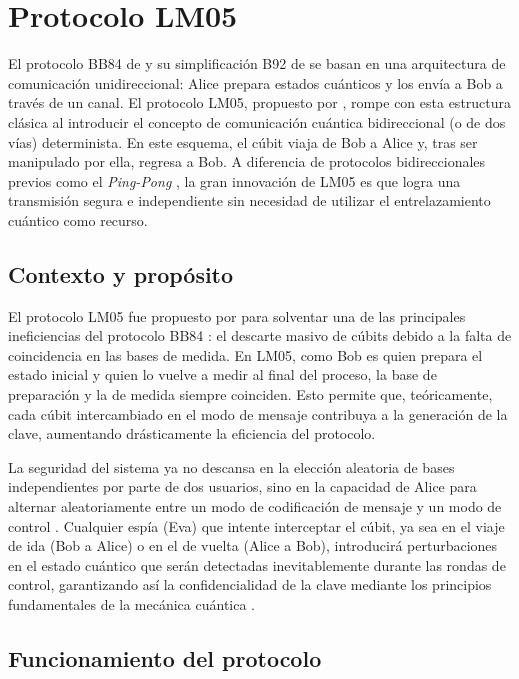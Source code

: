 \section{Protocolo LM05}

El protocolo BB84 de \cite{bennett1984} y su simplificación B92 de \cite{bennett1992} se basan en una arquitectura de comunicación unidireccional: Alice prepara estados cuánticos y los envía a Bob a través de un canal. El protocolo LM05, propuesto por \cite{lucamarini2005}, rompe con esta estructura clásica al introducir el concepto de comunicación cuántica bidireccional (o de dos vías) determinista. En este esquema, el cúbit viaja de Bob a Alice y, tras ser manipulado por ella, regresa a Bob. A diferencia de protocolos bidireccionales previos como el \textit{Ping-Pong} \citep{bostrom2002}, la gran innovación de LM05 es que logra una transmisión segura e independiente sin necesidad de utilizar el entrelazamiento cuántico como recurso.

\subsection{Contexto y propósito}

El protocolo LM05 fue propuesto por \cite{lucamarini2005} para solventar una de las principales ineficiencias del protocolo BB84 \citep{bennett1984}: el descarte masivo de cúbits debido a la falta de coincidencia en las bases de medida. En LM05, como Bob es quien prepara el estado inicial y quien lo vuelve a medir al final del proceso, la base de preparación y la de medida siempre coinciden. Esto permite que, teóricamente, cada cúbit intercambiado en el modo de mensaje contribuya a la generación de la clave, aumentando drásticamente la eficiencia del protocolo.

La seguridad del sistema ya no descansa en la elección aleatoria de bases independientes por parte de dos usuarios, sino en la capacidad de Alice para alternar aleatoriamente entre un modo de codificación de mensaje y un modo de control \citep{lucamarini2005}. Cualquier espía (Eva) que intente interceptar el cúbit, ya sea en el viaje de ida (Bob a Alice) o en el de vuelta (Alice a Bob), introducirá perturbaciones en el estado cuántico que serán detectadas inevitablemente durante las rondas de control, garantizando así la confidencialidad de la clave mediante los principios fundamentales de la mecánica cuántica \citep{wootters1982}.

\subsection{Funcionamiento del protocolo}

